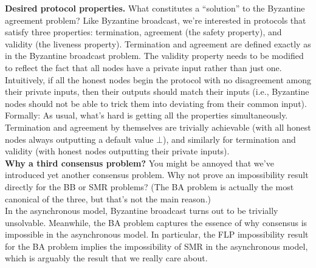 \noindent
\textbf{Desired protocol properties.} What constitutes a “solution” to the Byzantine agreement
problem? Like Byzantine broadcast, we’re interested in protocols that satisfy three properties: termination, agreement (the safety property), and validity (the liveness property). Termination and agreement are defined exactly as in the Byzantine broadcast problem. The
validity property needs to be modified to reflect the fact that all nodes have a private input
rather than just one. Intuitively, if all the honest nodes begin the protocol with no disagreement among their private inputs, then their outputs should match their inputs (i.e., Byzantine nodes should not be able to trick them into deviating from their common input).
Formally:
As usual, what’s hard is getting all the properties simultaneously. Termination and agreement by themselves are trivially achievable (with all honest nodes always outputting a default value $\bot$), and similarly for termination and validity (with honest nodes outputting their private inputs).\\

\noindent
\textbf{Why a third consensus problem?} You might be annoyed that we’ve introduced yet
another consensus problem. Why not prove an impossibility result directly for the BB or
SMR problems? (The BA problem is actually the most canonical of the three, but that’s
not the main reason.)\\
In the asynchronous model, Byzantine broadcast turns out to be trivially unsolvable.
Meanwhile, the BA problem captures the essence of why consensus is impossible in the
asynchronous model. In particular, the FLP impossibility result for the BA problem implies
the impossibility of SMR in the asynchronous model, which is arguably the result that we
really care about.

